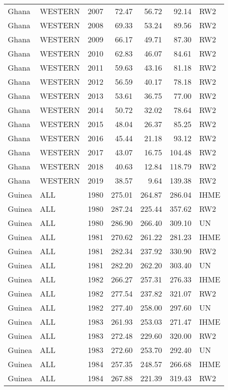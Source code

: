 \begin{longtable}{lllrrrl}
  Ghana & WESTERN & 2007 & 72.47 & 56.72 & 92.14 & RW2 \\ 
  Ghana & WESTERN & 2008 & 69.33 & 53.24 & 89.56 & RW2 \\ 
  Ghana & WESTERN & 2009 & 66.17 & 49.71 & 87.30 & RW2 \\ 
  Ghana & WESTERN & 2010 & 62.83 & 46.07 & 84.61 & RW2 \\ 
  Ghana & WESTERN & 2011 & 59.63 & 43.16 & 81.18 & RW2 \\ 
  Ghana & WESTERN & 2012 & 56.59 & 40.17 & 78.18 & RW2 \\ 
  Ghana & WESTERN & 2013 & 53.61 & 36.75 & 77.00 & RW2 \\ 
  Ghana & WESTERN & 2014 & 50.72 & 32.02 & 78.64 & RW2 \\ 
  Ghana & WESTERN & 2015 & 48.04 & 26.37 & 85.25 & RW2 \\ 
  Ghana & WESTERN & 2016 & 45.44 & 21.18 & 93.12 & RW2 \\ 
  Ghana & WESTERN & 2017 & 43.07 & 16.75 & 104.48 & RW2 \\ 
  Ghana & WESTERN & 2018 & 40.63 & 12.84 & 118.79 & RW2 \\ 
  Ghana & WESTERN & 2019 & 38.57 & 9.64 & 139.38 & RW2 \\ 
  Guinea & ALL & 1980 & 275.01 & 264.87 & 286.04 & IHME \\ 
  Guinea & ALL & 1980 & 287.24 & 225.44 & 357.62 & RW2 \\ 
  Guinea & ALL & 1980 & 286.90 & 266.40 & 309.10 & UN \\ 
  Guinea & ALL & 1981 & 270.62 & 261.22 & 281.23 & IHME \\ 
  Guinea & ALL & 1981 & 282.34 & 237.92 & 330.90 & RW2 \\ 
  Guinea & ALL & 1981 & 282.20 & 262.20 & 303.40 & UN \\ 
  Guinea & ALL & 1982 & 266.27 & 257.31 & 276.33 & IHME \\ 
  Guinea & ALL & 1982 & 277.54 & 237.82 & 321.07 & RW2 \\ 
  Guinea & ALL & 1982 & 277.40 & 258.00 & 297.60 & UN \\ 
  Guinea & ALL & 1983 & 261.93 & 253.03 & 271.47 & IHME \\ 
  Guinea & ALL & 1983 & 272.48 & 229.60 & 320.00 & RW2 \\ 
  Guinea & ALL & 1983 & 272.60 & 253.70 & 292.40 & UN \\ 
  Guinea & ALL & 1984 & 257.35 & 248.57 & 266.68 & IHME \\ 
  Guinea & ALL & 1984 & 267.88 & 221.39 & 319.43 & RW2 \\ 

\end{longtable}
